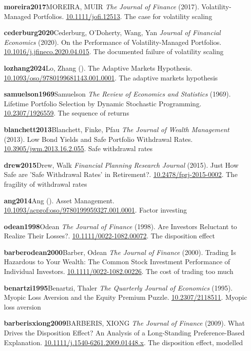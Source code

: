 \noindent\textbf{moreira2017}\quad MOREIRA, MUIR \emph{The Journal of Finance} (2017). Volatility-Managed Portfolios. \url{10.1111/jofi.12513}. The case for volatility scaling\par
\noindent\textbf{cederburg2020}\quad Cederburg, O’Doherty, Wang, Yan \emph{Journal of Financial Economics} (2020). On the Performance of Volatility-Managed Portfolios. \url{10.1016/j.jfineco.2020.04.015}. The documented failure of volatility scaling\par
\noindent\textbf{lozhang2024}\quad Lo, Zhang \emph{} (). The Adaptive Markets Hypothesis. \url{10.1093/oso/9780199681143.001.0001}. The adaptive markets hypothesis\par
\noindent\textbf{samuelson1969}\quad Samuelson \emph{The Review of Economics and Statistics} (1969). Lifetime Portfolio Selection by Dynamic Stochastic Programming. \url{10.2307/1926559}. The sequence of returns\par
\noindent\textbf{blanchett2013}\quad Blanchett, Finke, Pfau \emph{The Journal of Wealth Management} (2013). Low Bond Yields and Safe Portfolio Withdrawal Rates. \url{10.3905/jwm.2013.16.2.055}. Safe withdrawal rates\par
\noindent\textbf{drew2015}\quad Drew, Walk \emph{Financial Planning Research Journal} (2015). Just How Safe are 'Safe Withdrawal Rates' in Retirement?. \url{10.2478/fprj-2015-0002}. The fragility of withdrawal rates\par
\noindent\textbf{ang2014}\quad Ang \emph{} (). Asset Management. \url{10.1093/acprof:oso/9780199959327.001.0001}. Factor investing\par
\noindent\textbf{odean1998}\quad Odean \emph{The Journal of Finance} (1998). Are Investors Reluctant to Realize Their Losses?. \url{10.1111/0022-1082.00072}. The disposition effect\par
\noindent\textbf{barberodean2000}\quad Barber, Odean \emph{The Journal of Finance} (2000). Trading Is Hazardous to Your Wealth: The Common Stock Investment Performance of Individual Investors. \url{10.1111/0022-1082.00226}. The cost of trading too much\par
\noindent\textbf{benartzi1995}\quad Benartzi, Thaler \emph{The Quarterly Journal of Economics} (1995). Myopic Loss Aversion and the Equity Premium Puzzle. \url{10.2307/2118511}. Myopic loss aversion\par
\noindent\textbf{barberisxiong2009}\quad BARBERIS, XIONG \emph{The Journal of Finance} (2009). What Drives the Disposition Effect? An Analysis of a Long-Standing Preference-Based Explanation. \url{10.1111/j.1540-6261.2009.01448.x}. The disposition effect, modelled\par

